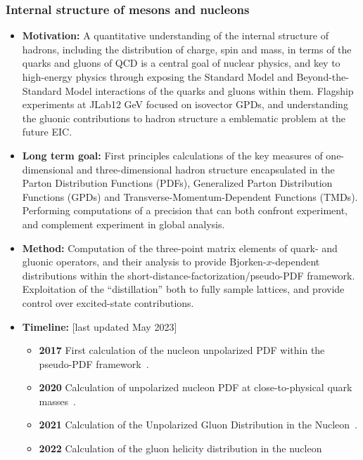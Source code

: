 \documentclass[12pt,hyperpdf]{article}
\begin{document}
    
\subsubsection{Internal structure of mesons and nucleons}\label{sec:meshadstruct}
\begin{itemize}
   \item{\bf Motivation:} A quantitative understanding of the internal
     structure of hadrons, including the distribution of charge, spin
     and mass, in terms of the quarks and gluons of QCD is a central
     goal of nuclear physics, and key to high-energy physics through
     exposing the Standard Model and Beyond-the-Standard Model
     interactions of the quarks and gluons within them.  Flagship
     experiments at JLab\@12 GeV focused on isovector GPDs, and
     understanding the gluonic contributions to hadron structure a
     emblematic problem at the future EIC.
   \item{\bf Long term goal:} First principles calculations of the key
     measures of one-dimensional and three-dimensional hadron
     structure encapsulated in the Parton Distribution Functions (PDFs),
     Generalized Parton Distribution Functions (GPDs) and
     Transverse-Momentum-Dependent Functions (TMDs).  Performing
     computations of a precision that can both confront experiment,
     and complement experiment in global analysis.
   \item{\bf Method:} Computation of the three-point matrix elements of quark- and
     gluonic operators, and their analysis to provide
     Bjorken-$x$-dependent distributions within the
     short-distance-factorization/pseudo-PDF framework.  Exploitation
     of the ``distillation'' both to fully sample lattices, and
     provide control over excited-state contributions.
\item{\bf Timeline:} \hfill [last updated May 2023]
\begin{itemize}
   \item{\bf 2017} First calculation of the nucleon unpolarized PDF within
     the pseudo-PDF framework~\cite{Orginos:2017kos}.
   \item{\bf 2020} Calculation of unpolarized nucleon PDF at close-to-physical
     quark masses~\cite{Joo:2020spy}.
   \item{\bf 2021} Calculation of the Unpolarized Gluon Distribution in
     the Nucleon~\cite{HadStruc:2021wmh}.
   \item{\bf 2022} Calculation of the gluon helicity distribution in
     the nucleon~\cite{HadStruc:2022yaw}

\end{itemize}
\end{itemize}
\end{document}
